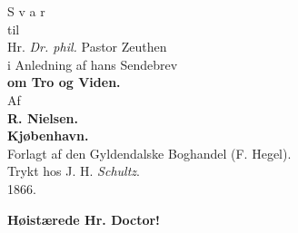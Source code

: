 \documentclass[12pt,a4paper]{article}
\newcommand{\opage}[1]{\marginnote{\footnotesize\textit{[#1]}}}
\begin{document}
\opage{1}\setcounter{footnote}{0}%
\begin{center}
{\Huge S v a r}\\[1.5em]
{\small til}\\[1.5em]
{\LARGE Hr. \textit{Dr. phil.} Pastor Zeuthen}\\[1em]
{\large i Anledning af hans Sendebrev}\\[1em]
{\Huge\bfseries om Tro og Viden.}\\[1em]
{\small Af}\\[0.5em]
{\large\bfseries R. Nielsen.}\\[6em]
{\bfseries Kjøbenhavn.}\\[0.5em]
Forlagt af den Gyldendalske Boghandel (F. Hegel).\\[0.3em]
{\footnotesize Trykt hos J. H. \emph{Schultz}.}\\[0.5em]
1866.
\end{center}
\clearpage
\opage{2}\setcounter{footnote}{0}%
\begin{center}
{\large\bfseries Høistærede Hr. Doctor!}
\end{center}
\end{document}
